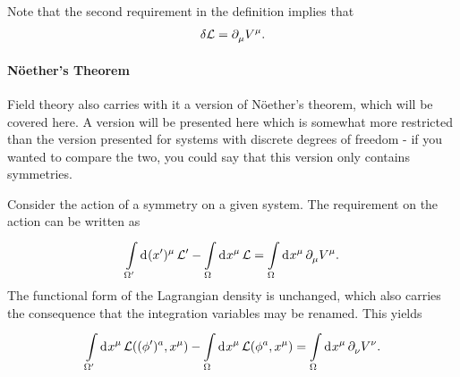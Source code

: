 Note that the second requirement in the definition implies that
\begin{align*}
	\var{\ensuremath{\mathcal{L}}} = \partial^{}_{\mu}V^{\mu}.
\end{align*}

\paragraph{Nöether's Theorem}
Field theory also carries with it a version of Nöether's theorem, which will be covered here. A version will be presented here which is somewhat more restricted than the version presented for systems with discrete degrees of freedom - if you wanted to compare the two, you could say that this version only contains symmetries.

Consider the action of a symmetry on a given system. The requirement on the action can be written as
\begin{align*}
	\int\limits_{\Omega^{\prime}}^{}\dd[]{(x^{\prime})^{\mu}}\mathcal{L}^{\prime} - \int\limits_{\Omega}^{}\dd[]{x^{\mu}}\mathcal{L} = \int\limits_{\Omega}^{}\dd[]{x^{\mu}}\partial^{}_{\mu}V^{\mu}.
\end{align*}
The functional form of the Lagrangian density is unchanged, which also carries the consequence that the integration variables may be renamed. This yields
\begin{align*}
	\int\limits_{\Omega^{\prime}}^{}\dd[]{x^{\mu}}\mathcal{L}((\phi^{\prime})^{a}, x^{\mu}) - \int\limits_{\Omega}^{}\dd[]{x^{\mu}}\mathcal{L}(\phi^{a}, x^{\mu}) = \int\limits_{\Omega}^{}\dd[]{x^{\mu}}\partial^{}_{\nu}V^{\nu}.
\end{align*}

